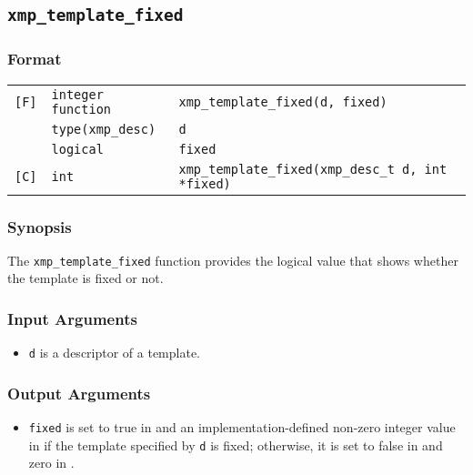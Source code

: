 \subsection{\tt xmp\_template\_fixed}

\subsubsection*{Format}

\begin{tabular}{lll}

\verb![F]!& {\tt integer function}& {\tt xmp\_template\_fixed(d, fixed)}\\
          & {\tt type(xmp\_desc)} & {\tt d}\\
          & {\tt logical} & {\tt fixed}\\

\verb![C]!&  {\tt int}& {\tt xmp\_template\_fixed(xmp\_desc\_t d, int *fixed)}\\

\end{tabular}

\subsubsection*{Synopsis}

The {\tt xmp\_template\_fixed} function provides the logical value that
shows whether the template is fixed or not.


\subsubsection*{Input Arguments}
\begin{itemize}
 \item {\tt d} is a descriptor of a template.
\end{itemize}

\subsubsection*{Output Arguments}
\begin{itemize}
 \item {\tt fixed} is set to true in {\XMPF} and an
       implementation-defined non-zero integer value in {\XMPC} if the
       template specified by {\tt d} is fixed; otherwise, it is set to false in
       {\XMPF} and zero in {\XMPC}.
\end{itemize}

